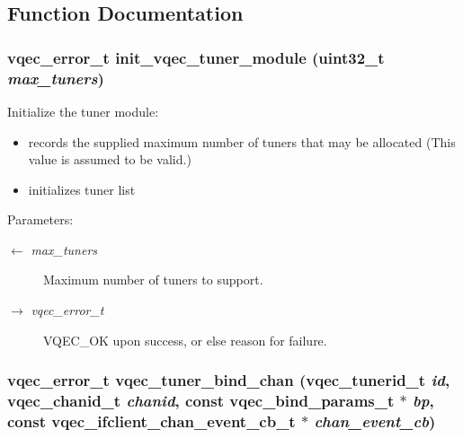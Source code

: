 \subsection{Function Documentation}
\subsubsection{\setlength{\rightskip}{0pt plus 5cm}vqec\_\-error\_\-t init\_\-vqec\_\-tuner\_\-module (uint32\_\-t {\em max\_\-tuners})}\label{vqec__tuner_8c_5fa468ebc64ffaa41e00bf12914944ac}


Initialize the tuner module:\begin{itemize}
\item records the supplied maximum number of tuners that may be allocated (This value is assumed to be valid.)\item initializes tuner list\end{itemize}


\begin{Desc}
\item[Parameters:]
\begin{description}
\item[\mbox{$\leftarrow$} {\em max\_\-tuners}]Maximum number of tuners to support. \item[\mbox{$\rightarrow$} {\em vqec\_\-error\_\-t}]VQEC\_\-OK upon success, or else reason for failure. \end{description}
\end{Desc}
\subsubsection{\setlength{\rightskip}{0pt plus 5cm}vqec\_\-error\_\-t vqec\_\-tuner\_\-bind\_\-chan (vqec\_\-tunerid\_\-t {\em id}, \bf{vqec\_\-chanid\_\-t} {\em chanid}, const \bf{vqec\_\-bind\_\-params\_\-t} $\ast$ {\em bp}, const \bf{vqec\_\-ifclient\_\-chan\_\-event\_\-cb\_\-t} $\ast$ {\em chan\_\-event\_\-cb})}\label{vqec__tuner_8c_29cf5cce3c4bd39bfeef63c48e7a2e10}


